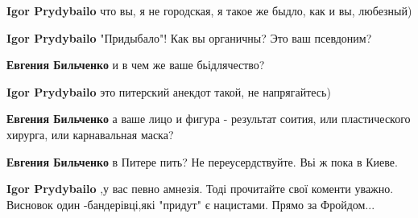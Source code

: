\begin{itemize}
\begin{itemize}
\textbf{Igor Prydybailo} что вы, я не городская, я такое же быдло, как и вы, любезный)

 
\textbf{Igor Prydybailo} "Придыбало"! Как вы органичны? Это ваш псевдоним?

 
\textbf{Евгения Бильченко} и в чем же ваше бьідлячество?

 
\textbf{Igor Prydybailo} это питерский анекдот такой, не напрягайтесь)

 
\textbf{Евгения Бильченко} а ваше лицо и фигура - результат соития, или пластического хирурга, или карнавальная маска?

 
\textbf{Евгения Бильченко} в Питере пить? Не переусердствуйте. Вьі ж пока в Киеве.

 
\textbf{Igor Prydybailo} ,у вас певно амнезія. Тоді прочитайте свої коменти уважно. Висновок один -бандерівці,які "придут" є нацистами. Прямо за Фройдом...


\end{itemize}
\end{itemize}
